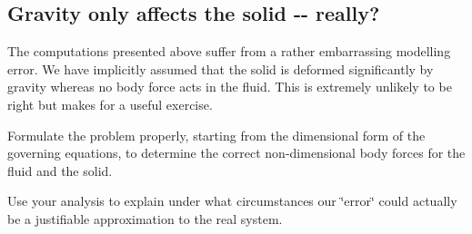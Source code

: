 \hypertarget{index_b_f}{}\subsection{Gravity only affects the solid -\/-\/ really?}\label{index_b_f}
The computations presented above suffer from a rather embarrassing modelling error. We have implicitly assumed that the solid is deformed significantly by gravity whereas no body force acts in the fluid. This is extremely unlikely to be right but makes for a useful exercise.
\begin{DoxyEnumerate}
\item Formulate the problem properly, starting from the dimensional form of the governing equations, to determine the correct non-\/dimensional body forces for the fluid and the solid. ~\newline
~\newline

\item Use your analysis to explain under what circumstances our \char`\"{}error\char`\"{} could actually be a justifiable approximation to the real system.
\end{DoxyEnumerate}



